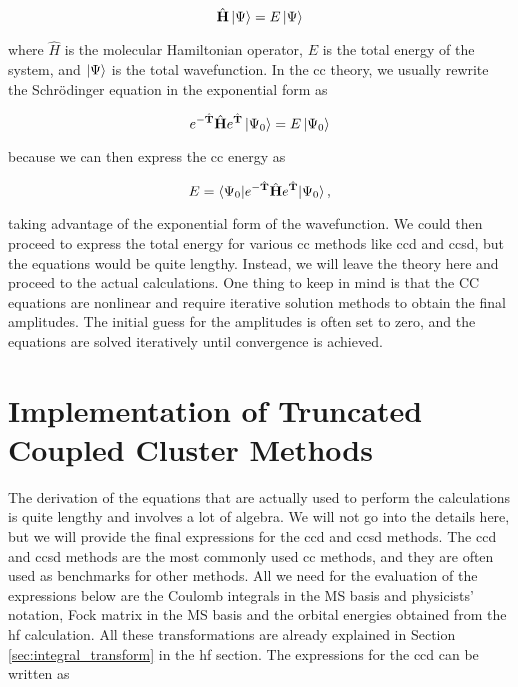 \begin{equation}
\hat{\mathbf{H}}\ket{\Psi}=E\ket{\Psi}
\end{equation}

where \(\hat{H}\) is the molecular Hamiltonian operator, \(E\) is the total energy of the system, and \(\ket{\Psi}\) is the total wavefunction. In the \acrshort{cc} theory, we usually rewrite the Schrödinger equation in the exponential form as

\begin{equation}
e^{-\hat{\mathbf{T}}}\hat{\mathbf{H}}e^{\hat{\mathbf{T}}}\ket{\Psi_0}=E\ket{\Psi_0}
\end{equation}

because we can then express the \acrshort{cc} energy as

\begin{equation}
E=\braket{\Psi_0|e^{-\hat{\mathbf{T}}}\hat{\mathbf{H}}e^{\hat{\mathbf{T}}}|\Psi_0},
\end{equation}

taking advantage of the exponential form of the wavefunction. We could then proceed to express the total energy for various \acrshort{cc} methods like \acrshort{ccd} and \acrshort{ccsd}, but the equations would be quite lengthy. Instead, we will leave the theory here and proceed to the actual calculations. One thing to keep in mind is that the CC equations are nonlinear and require iterative solution methods to obtain the final amplitudes. The initial guess for the amplitudes is often set to zero, and the equations are solved iteratively until convergence is achieved.

\section{Implementation of Truncated Coupled Cluster Methods}

The derivation of the equations that are actually used to perform the calculations is quite lengthy and involves a lot of algebra. We will not go into the details here, but we will provide the final expressions for the \acrshort{ccd} and \acrshort{ccsd} methods.\cite{10.1063/1.460620} The \acrshort{ccd} and \acrshort{ccsd} methods are the most commonly used \acrshort{cc} methods, and they are often used as benchmarks for other methods. All we need for the evaluation of the expressions below are the Coulomb integrals in the MS basis and physicists' notation, Fock matrix in the MS basis and the orbital energies obtained from the \acrshort{hf} calculation. All these transformations are already explained in Section \ref{sec:integral_transform} in the \acrshort{hf} section. The expressions for the \acrshort{ccd} can be written as


